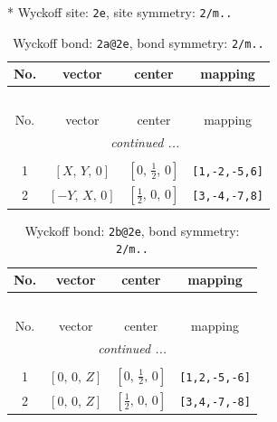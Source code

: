\documentclass[fleqn,8pt]{jsarticle}
\begin{document}
* Wyckoff site: {\tt 2e}, site symmetry: {\tt 2/m..}
\renewcommand{\arraystretch}{1.2}
\begin{longtable}{cccc}
\caption{Wyckoff bond: {\tt 2a@2e}, bond symmetry: {\tt 2/m..}}
 \\
 \hline \hline
No. & vector & center & mapping \\ \hline \endfirsthead

\multicolumn{3}{l}{\tablename\ \thetable{}} \\
 \hline \hline
No. & vector & center & mapping \\ \hline \endhead

 \hline \hline
\multicolumn{3}{r}{\footnotesize\it continued ...} \\ \endfoot

 \hline \hline
\multicolumn{3}{r}{} \\ \endlastfoot

1 & $\left[ X,\, Y,\, 0 \right]$ & $\left[ 0,\, \frac{1}{2},\, 0 \right]$ & {\tt [1,-2,-5,6]} \\ \hline
2 & $\left[ - Y,\, X,\, 0 \right]$ & $\left[ \frac{1}{2},\, 0,\, 0 \right]$ & {\tt [3,-4,-7,8]} \\
\end{longtable}
\renewcommand{\arraystretch}{1.2}
\begin{longtable}{cccc}
\caption{Wyckoff bond: {\tt 2b@2e}, bond symmetry: {\tt 2/m..}}
 \\
 \hline \hline
No. & vector & center & mapping \\ \hline \endfirsthead

\multicolumn{3}{l}{\tablename\ \thetable{}} \\
 \hline \hline
No. & vector & center & mapping \\ \hline \endhead

 \hline \hline
\multicolumn{3}{r}{\footnotesize\it continued ...} \\ \endfoot

 \hline \hline
\multicolumn{3}{r}{} \\ \endlastfoot

1 & $\left[ 0,\, 0,\, Z \right]$ & $\left[ 0,\, \frac{1}{2},\, 0 \right]$ & {\tt [1,2,-5,-6]} \\ \hline
2 & $\left[ 0,\, 0,\, Z \right]$ & $\left[ \frac{1}{2},\, 0,\, 0 \right]$ & {\tt [3,4,-7,-8]} \\
\end{longtable}
\renewcommand{\arraystretch}{1.2}
\end{document}
